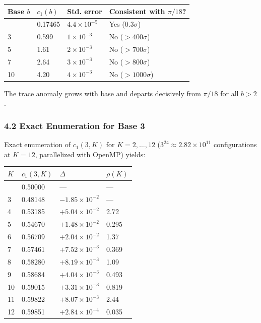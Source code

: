 \documentclass[
  11pt,
]{article}
\begin{document}
\begin{longtable}[]{@{}llll@{}}
\toprule\noalign{}
Base \(b\) & \(c_1(b)\) & Std. error & Consistent with \(\pi/18\)? \\
\midrule\noalign{}
\endhead
\bottomrule\noalign{}
\endlastfoot
2 & 0.17465 & \(4.4 \times 10^{-5}\) & Yes (\(0.3\sigma\)) \\
3 & 0.599 & \(1 \times 10^{-3}\) & No (\(>400\sigma\)) \\
5 & 1.61 & \(2 \times 10^{-3}\) & No (\(>700\sigma\)) \\
7 & 2.64 & \(3 \times 10^{-3}\) & No (\(>800\sigma\)) \\
10 & 4.20 & \(4 \times 10^{-3}\) & No (\(>1000\sigma\)) \\
\end{longtable}

The trace anomaly grows with base and departs decisively from \(\pi/18\) for all
\(b > 2\).

\subsubsection{4.2 Exact Enumeration for Base
3}\label{exact-enumeration-for-base-3}

Exact enumeration of \(c_1(3, K)\) for \(K = 2, \ldots, 12\)
(\(3^{24} \approx 2.82 \times 10^{11}\) configurations at \(K = 12\),
parallelized with OpenMP) yields:

\begin{longtable}[]{@{}llll@{}}
\toprule\noalign{}
\(K\) & \(c_1(3, K)\) & \(\Delta\) & \(\rho(K)\) \\
\midrule\noalign{}
\endhead
\bottomrule\noalign{}
\endlastfoot
2 & 0.50000 & --- & --- \\
3 & 0.48148 & \(-1.85 \times 10^{-2}\) & --- \\
4 & 0.53185 & \(+5.04 \times 10^{-2}\) & 2.72 \\
5 & 0.54670 & \(+1.48 \times 10^{-2}\) & 0.295 \\
6 & 0.56709 & \(+2.04 \times 10^{-2}\) & 1.37 \\
7 & 0.57461 & \(+7.52 \times 10^{-3}\) & 0.369 \\
8 & 0.58280 & \(+8.19 \times 10^{-3}\) & 1.09 \\
9 & 0.58684 & \(+4.04 \times 10^{-3}\) & 0.493 \\
10 & 0.59015 & \(+3.31 \times 10^{-3}\) & 0.819 \\
11 & 0.59822 & \(+8.07 \times 10^{-3}\) & 2.44 \\
12 & 0.59851 & \(+2.84 \times 10^{-4}\) & 0.035 \\
\end{longtable}
\end{document}
